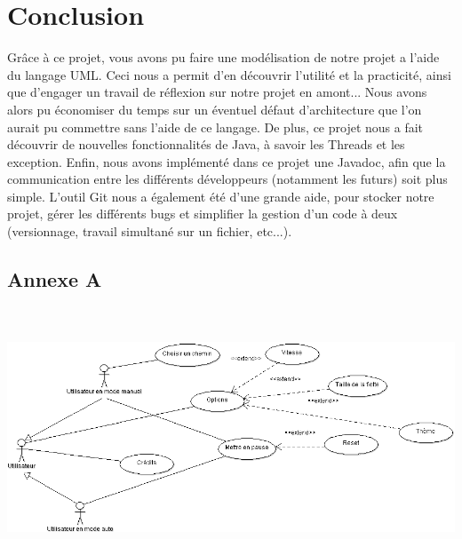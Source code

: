 \documentclass[a4paper, titlepage]{report}
\begin{document}
\chapter*{Conclusion}
\vspace{7cm}
Grâce à ce projet, vous avons pu faire une modélisation de notre projet a l'aide du langage UML. Ceci nous a permit d'en découvrir l'utilité et la practicité, ainsi que d'engager un travail de réflexion sur notre projet en amont... Nous avons alors pu économiser du temps sur un éventuel défaut d'architecture que l'on aurait pu commettre sans l'aide de ce langage. De plus, ce projet nous a fait découvrir de nouvelles fonctionnalités de Java, à savoir les Threads et les exception. Enfin, nous avons implémenté dans ce projet une Javadoc, afin que la communication entre les différents développeurs (notamment les futurs) soit plus simple. L'outil Git nous a également été d'une grande aide, pour stocker notre projet, gérer les différents bugs et simplifier la gestion d'un code à deux (versionnage, travail simultané sur un fichier, etc...).
\appendix
\begin{landscape}
\chapter*{Annexe A}
\includegraphics[width=684px, height=290px]{Images/CasUtilisation.PNG}
\end{landscape}
\setcounter{page}{18}
\end{document}
